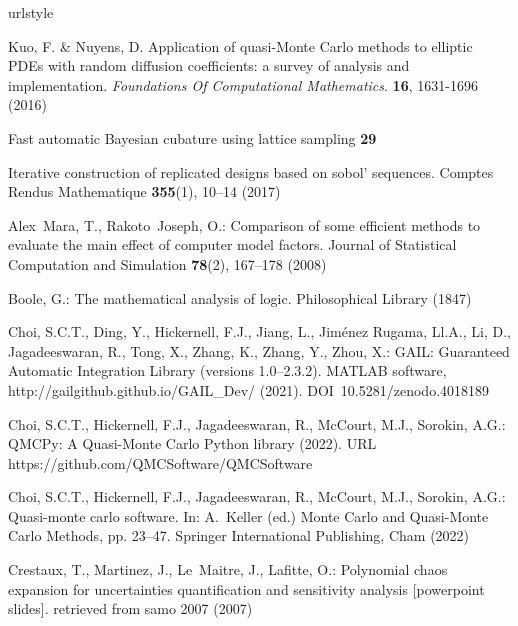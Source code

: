 \documentclass[graybox]{svmult}
\begin{document}
\begin{thebibliography}{10}
\providecommand{\url}[1]{{#1}}
\providecommand{\urlprefix}{URL }
\expandafter\ifx\csname urlstyle\endcsname\relax
  \providecommand{\doi}[1]{DOI~\discretionary{}{}{}#1}\else
  \providecommand{\doi}{DOI~\discretionary{}{}{}\begingroup
  \urlstyle{rm}\Url}\fi

Kuo, F. \& Nuyens, D. Application of quasi-Monte Carlo methods to elliptic PDEs with random diffusion coefficients: a survey of analysis and implementation. {\em Foundations Of Computational Mathematics}. \textbf{16}, 1631-1696 (2016)

Fast automatic Bayesian cubature using lattice sampling \textbf{29}

Iterative construction of replicated designs based on sobol' sequences.
\newblock Comptes Rendus Mathematique \textbf{355}(1), 10--14 (2017)

Alex~Mara, T., Rakoto~Joseph, O.: Comparison of some efficient methods to
  evaluate the main effect of computer model factors.
\newblock Journal of Statistical Computation and Simulation \textbf{78}(2),
  167--178 (2008)

Boole, G.: The mathematical analysis of logic.
\newblock Philosophical Library (1847)

Choi, S.C.T., Ding, Y., Hickernell, F.J., Jiang, L., {Jim\'enez Rugama},
  {\relax Ll}.A., Li, D., Jagadeeswaran, R., Tong, X., Zhang, K., Zhang, Y.,
  Zhou, X.: {GAIL}: {G}uaranteed {A}utomatic {I}ntegration {L}ibrary (versions
  1.0--2.3.2).
\newblock MATLAB software, \url{http://gailgithub.github.io/GAIL\_Dev/} (2021).
\newblock \doi{10.5281/zenodo.4018189}

Choi, S.C.T., Hickernell, F.J., Jagadeeswaran, R., McCourt, M.J., Sorokin,
  A.G.: {QMCPy}: A {Q}uasi-{M}onte {C}arlo {P}ython library (2022).
\newblock \urlprefix\url{https://github.com/QMCSoftware/QMCSoftware}

Choi, S.C.T., Hickernell, F.J., Jagadeeswaran, R., McCourt, M.J., Sorokin,
  A.G.: Quasi-monte carlo software.
\newblock In: A.~Keller (ed.) Monte Carlo and Quasi-Monte Carlo Methods, pp.
  23--47. Springer International Publishing, Cham (2022)

Crestaux, T., Martinez, J., Le~Maitre, J., Lafitte, O.: Polynomial chaos
  expansion for uncertainties quantification and sensitivity analysis
  [powerpoint slides]. retrieved from samo 2007 (2007)


\end{thebibliography}
\end{document}
